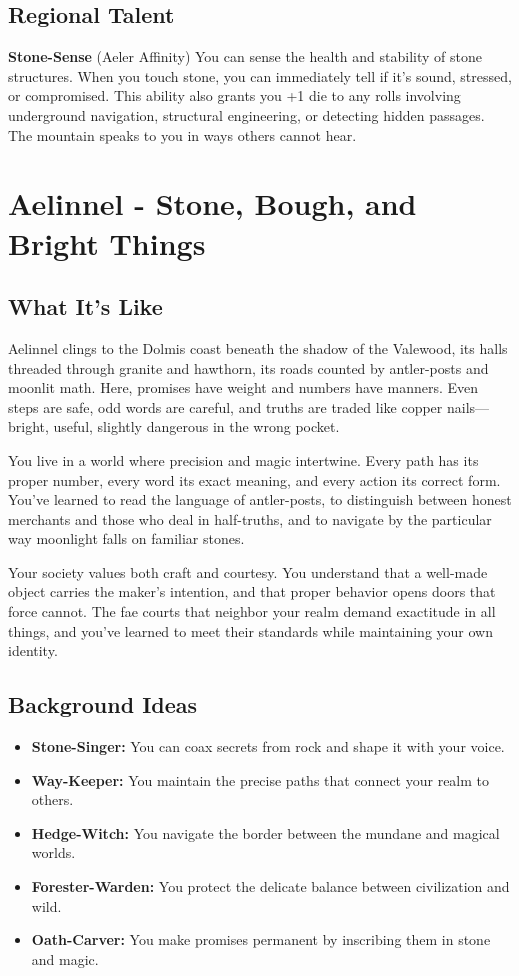 \documentclass[11pt]{article}
\newcommand{\region}[1]{\section*{#1}}
\newcommand{\subregion}[1]{\subsection*{#1}}
\begin{document}
\begin{multicols}{2}
\subregion{Regional Talent}

\textbf{Stone-Sense} (Aeler Affinity)
You can sense the health and stability of stone structures. When you touch stone, you can immediately tell if it's sound, stressed, or compromised. This ability also grants you +1 die to any rolls involving underground navigation, structural engineering, or detecting hidden passages. The mountain speaks to you in ways others cannot hear.

\end{multicols}

\region{Aelinnel - Stone, Bough, and Bright Things}

\begin{multicols}{2}
\subregion{What It's Like}

Aelinnel clings to the Dolmis coast beneath the shadow of the Valewood, its halls threaded through granite and hawthorn, its roads counted by antler-posts and moonlit math. Here, promises have weight and numbers have manners. Even steps are safe, odd words are careful, and truths are traded like copper nails—bright, useful, slightly dangerous in the wrong pocket.

You live in a world where precision and magic intertwine. Every path has its proper number, every word its exact meaning, and every action its correct form. You've learned to read the language of antler-posts, to distinguish between honest merchants and those who deal in half-truths, and to navigate by the particular way moonlight falls on familiar stones.

Your society values both craft and courtesy. You understand that a well-made object carries the maker's intention, and that proper behavior opens doors that force cannot. The fae courts that neighbor your realm demand exactitude in all things, and you've learned to meet their standards while maintaining your own identity.

\columnbreak

\subregion{Background Ideas}

\begin{itemize}[leftmargin=*]
    \item \textbf{Stone-Singer:} You can coax secrets from rock and shape it with your voice.
    \item \textbf{Way-Keeper:} You maintain the precise paths that connect your realm to others.
    \item \textbf{Hedge-Witch:} You navigate the border between the mundane and magical worlds.
    \item \textbf{Forester-Warden:} You protect the delicate balance between civilization and wild.
    \item \textbf{Oath-Carver:} You make promises permanent by inscribing them in stone and magic.
\end{itemize}


\end{multicols}
\end{document}
